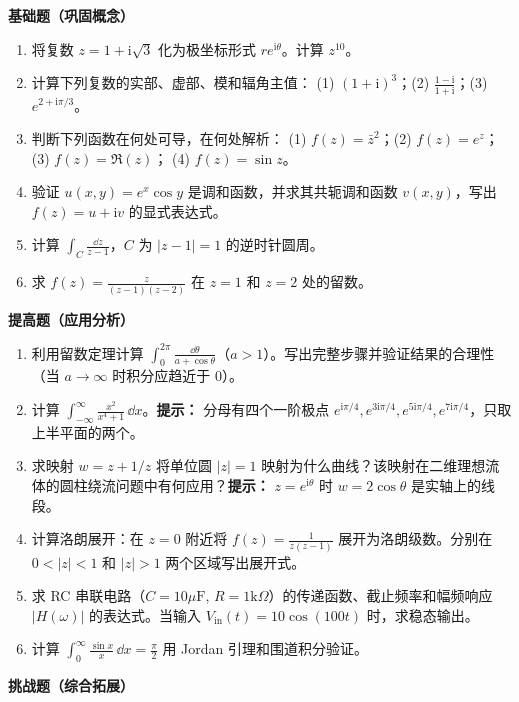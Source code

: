 \textbf{基础题（巩固概念）}

\begin{enumerate}
\item 将复数 $z = 1 + \mathrm{i}\sqrt{3}$ 化为极坐标形式 $re^{\mathrm{i}\theta}$。计算 $z^{10}$。
\item 计算下列复数的实部、虚部、模和辐角主值：
(1) $(1+\mathrm{i})^3$；(2) $\frac{1-\mathrm{i}}{1+\mathrm{i}}$；(3) $e^{2+\mathrm{i}\pi/3}$。
\item 判断下列函数在何处可导，在何处解析：
(1) $f(z) = \bar{z}^2$；(2) $f(z) = e^z$；(3) $f(z) = \Re(z)$；
(4) $f(z) = \sin z$。
\item 验证 $u(x,y) = e^x\cos y$ 是调和函数，并求其共轭调和函数 $v(x,y)$，写出 $f(z)=u+\mathrm{i}v$ 的显式表达式。
\item 计算 $\displaystyle\int_C \frac{\dd z}{z-1}$，$C$ 为 $|z-1|=1$ 的逆时针圆周。
\item 求 $f(z) = \frac{z}{(z-1)(z-2)}$ 在 $z=1$ 和 $z=2$ 处的留数。
\end{enumerate}

\textbf{提高题（应用分析）}

\begin{enumerate}
\item[7.] 利用留数定理计算 $\displaystyle\int_0^{2\pi}\frac{\dd\theta}{a+\cos\theta}$（$a>1$）。写出完整步骤并验证结果的合理性（当 $a\to\infty$ 时积分应趋近于 0）。
\item[8.] 计算 $\displaystyle\int_{-\infty}^{\infty}\frac{x^2}{x^4+1}\,\dd x$。\textbf{提示：} 分母有四个一阶极点 $e^{\mathrm{i}\pi/4}, e^{3\mathrm{i}\pi/4}, e^{5\mathrm{i}\pi/4}, e^{7\mathrm{i}\pi/4}$，只取上半平面的两个。
\item[9.] 求映射 $w = z + 1/z$ 将单位圆 $|z|=1$ 映射为什么曲线？该映射在二维理想流体的圆柱绕流问题中有何应用？\textbf{提示：} $z=e^{\mathrm{i}\theta}$ 时 $w = 2\cos\theta$ 是实轴上的线段。
\item[10.] 计算洛朗展开：在 $z=0$ 附近将 $f(z) = \frac{1}{z(z-1)}$ 展开为洛朗级数。分别在 $0<|z|<1$ 和 $|z|>1$ 两个区域写出展开式。
\item[11.] 求 RC 串联电路（$C=10\mu\text{F}$, $R=1\text{k}\Omega$）的传递函数、截止频率和幅频响应 $|H(\omega)|$ 的表达式。当输入 $V_{\text{in}}(t) = 10\cos(100t)$ 时，求稳态输出。
\item[12.] 计算 $\displaystyle\int_0^{\infty} \frac{\sin x}{x}\,\dd x = \frac{\pi}{2}$ 用 Jordan 引理和围道积分验证。
\end{enumerate}

\textbf{挑战题（综合拓展）}

